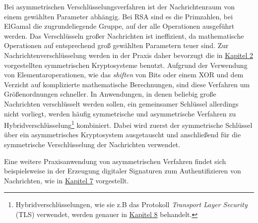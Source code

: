 Bei asymmetrischen Verschlüsselungsverfahren ist der Nachrichtenraum von einem gewählten Parameter abhängig. Bei RSA sind es die Primzahlen, bei ElGamal die zugrundeliegende Gruppe, auf der alle Operationen ausgeführt werden. Das Verschlüsseln großer Nachrichten ist ineffizient, da mathematische Operationen auf entsprechend groß gewählten Parametern teuer sind. Zur Nachrichtenverschlüsselung werden in der Praxis daher bevorzugt die in \hyperref[cha:symencryption]{Kapitel 2} vorgestellten symmetrischen Kryptosysteme benutzt. Aufgrund der Verwendung von Elementaroperationen, wie das \textit{shiften} von Bits oder einem XOR und dem Verzicht auf komplizierte mathematische Berechnungen, sind diese Verfahren um Größenordnungen schneller. In Anwendungen, in denen beliebig große Nachrichten verschlüsselt werden sollen, ein gemeinsamer Schlüssel allerdings nicht vorliegt, werden häufig symmetrische und asymmetrische Verfahren zu Hybridverschlüsselung\footnote{Hybridverschlüsselungen, wie sie z.B das Protokoll \textit{Transport Layer Security} (TLS) verwendet, werden genauer in \hyperref[cha:keyexchange]{Kapitel 8} behandelt.} kombiniert. Dabei wird zuerst der symmetrische Schlüssel über ein asymmetrisches Kryptosystem ausgetauscht und anschließend für die symmetrische Verschlüsselung der Nachrichten verwendet.

Eine weitere Praxisanwendung von asymmetrischen Verfahren findet sich beispielsweise in der Erzeugung digitaler Signaturen zum Authentifizieren von Nachrichten, wie in \hyperref[cha:asymmauth]{Kapitel 7} vorgestellt.